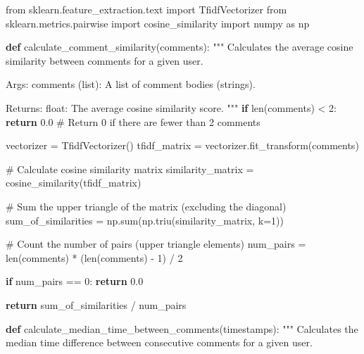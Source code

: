 \documentclass[
  12pt,
  letterpaper,
  DIV=11,
  numbers=noendperiod]{scrartcl}
\newenvironment{Shaded}{\begin{snugshade}}{\end{snugshade}}
\newcommand{\BuiltInTok}[1]{\textcolor[rgb]{0.00,0.23,0.31}{#1}}
\newcommand{\CommentTok}[1]{\textcolor[rgb]{0.37,0.37,0.37}{#1}}
\newcommand{\ControlFlowTok}[1]{\textcolor[rgb]{0.00,0.23,0.31}{\textbf{#1}}}
\newcommand{\DecValTok}[1]{\textcolor[rgb]{0.68,0.00,0.00}{#1}}
\newcommand{\FloatTok}[1]{\textcolor[rgb]{0.68,0.00,0.00}{#1}}
\newcommand{\ImportTok}[1]{\textcolor[rgb]{0.00,0.46,0.62}{#1}}
\newcommand{\KeywordTok}[1]{\textcolor[rgb]{0.00,0.23,0.31}{\textbf{#1}}}
\newcommand{\NormalTok}[1]{\textcolor[rgb]{0.00,0.23,0.31}{#1}}
\newcommand{\OperatorTok}[1]{\textcolor[rgb]{0.37,0.37,0.37}{#1}}
\begin{document}
\begin{Shaded}
\begin{Highlighting}[]
\ImportTok{from}\NormalTok{ sklearn.feature\_extraction.text }\ImportTok{import}\NormalTok{ TfidfVectorizer}
\ImportTok{from}\NormalTok{ sklearn.metrics.pairwise }\ImportTok{import}\NormalTok{ cosine\_similarity}
\ImportTok{import}\NormalTok{ numpy }\ImportTok{as}\NormalTok{ np}

\KeywordTok{def}\NormalTok{ calculate\_comment\_similarity(comments):}
    \CommentTok{"""}
\CommentTok{    Calculates the average cosine similarity between comments for a given user.}

\CommentTok{    Args:}
\CommentTok{        comments (list): A list of comment bodies (strings).}

\CommentTok{    Returns:}
\CommentTok{        float: The average cosine similarity score.}
\CommentTok{    """}
    \ControlFlowTok{if} \BuiltInTok{len}\NormalTok{(comments) }\OperatorTok{\textless{}} \DecValTok{2}\NormalTok{:}
        \ControlFlowTok{return} \FloatTok{0.0}  \CommentTok{\# Return 0 if there are fewer than 2 comments}

\NormalTok{    vectorizer }\OperatorTok{=}\NormalTok{ TfidfVectorizer()}
\NormalTok{    tfidf\_matrix }\OperatorTok{=}\NormalTok{ vectorizer.fit\_transform(comments)}

    \CommentTok{\# Calculate cosine similarity matrix}
\NormalTok{    similarity\_matrix }\OperatorTok{=}\NormalTok{ cosine\_similarity(tfidf\_matrix)}

    \CommentTok{\# Sum the upper triangle of the matrix (excluding the diagonal)}
\NormalTok{    sum\_of\_similarities }\OperatorTok{=}\NormalTok{ np.}\BuiltInTok{sum}\NormalTok{(np.triu(similarity\_matrix, k}\OperatorTok{=}\DecValTok{1}\NormalTok{))}

    \CommentTok{\# Count the number of pairs (upper triangle elements)}
\NormalTok{    num\_pairs }\OperatorTok{=} \BuiltInTok{len}\NormalTok{(comments) }\OperatorTok{*}\NormalTok{ (}\BuiltInTok{len}\NormalTok{(comments) }\OperatorTok{{-}} \DecValTok{1}\NormalTok{) }\OperatorTok{/} \DecValTok{2}

    \ControlFlowTok{if}\NormalTok{ num\_pairs }\OperatorTok{==} \DecValTok{0}\NormalTok{:}
        \ControlFlowTok{return} \FloatTok{0.0}

    \ControlFlowTok{return}\NormalTok{ sum\_of\_similarities }\OperatorTok{/}\NormalTok{ num\_pairs}

\KeywordTok{def}\NormalTok{ calculate\_median\_time\_between\_comments(timestamps):}
    \CommentTok{"""}
\CommentTok{    Calculates the median time difference between consecutive comments for a given user.}


\end{Highlighting}
\end{Shaded}
\end{document}
